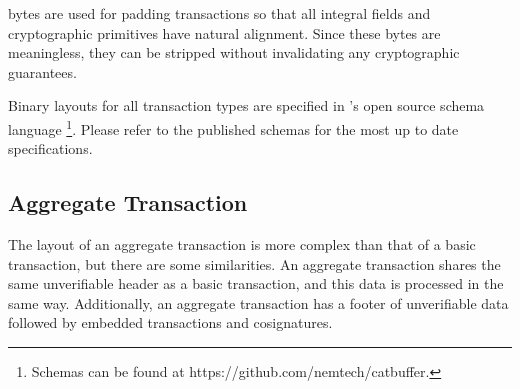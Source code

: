  bytes are used for padding transactions so that all integral fields and cryptographic primitives have natural alignment.
Since these bytes are meaningless, they can be stripped without invalidating any cryptographic guarantees.

Binary layouts for all transaction types are specified in \codename's open source schema language
\footnote{Schemas can be found at https://github.com/nemtech/catbuffer.}.
Please refer to the published schemas for the most up to date specifications.

\begin{figure}[H]
\end{figure}

\subsection{Aggregate Transaction}
\label{sec:transactions:aggregate}

The layout of an aggregate transaction is more complex than that of a basic transaction, but there are some similarities.
An aggregate transaction shares the same unverifiable header as a basic transaction, and this data is processed in the same way.
Additionally, an aggregate transaction has a footer of unverifiable data followed by embedded transactions and cosignatures.

